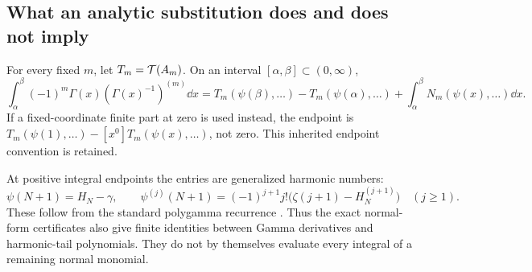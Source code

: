 \subsection{What an analytic substitution does and does not imply}
For every fixed $m$, let $T_m=\mathcal T(A_m)$. On an interval
$[\alpha,\beta]\subset(0,\infty)$,
\begin{equation}\label{ag:eq:ordinary-gamma-integral}
 \int_\alpha^\beta(-1)^m\Gamma(x)(\Gamma(x)^{-1})^{(m)}\dd x
 =T_m(\psi(\beta),\ldots)-T_m(\psi(\alpha),\ldots)
       +\int_\alpha^\beta N_m(\psi(x),\ldots)\dd x.
\end{equation}
If a fixed-coordinate finite part at zero is used instead, the endpoint
is $T_m(\psi(1),\ldots)-[x^0]T_m(\psi(x),\ldots)$, not zero.
This inherited endpoint convention \cite{Manuscript} is retained.

At positive integral endpoints the entries are generalized harmonic
numbers:
\begin{equation}\label{ag:eq:harmonic-substitution}
 \psi(N+1)=H_N-\gamma,\qquad
 \psi^{(j)}(N+1)=(-1)^{j+1}j!\bigl(\zeta(j+1)-H_N^{(j+1)}\bigr)
 \quad(j\ge1).
\end{equation}
These follow from the standard polygamma recurrence \cite{DLMFpsi}.
Thus the exact normal-form certificates also give finite identities
between Gamma derivatives and harmonic-tail polynomials. They do not
by themselves evaluate every integral of a remaining normal monomial.
